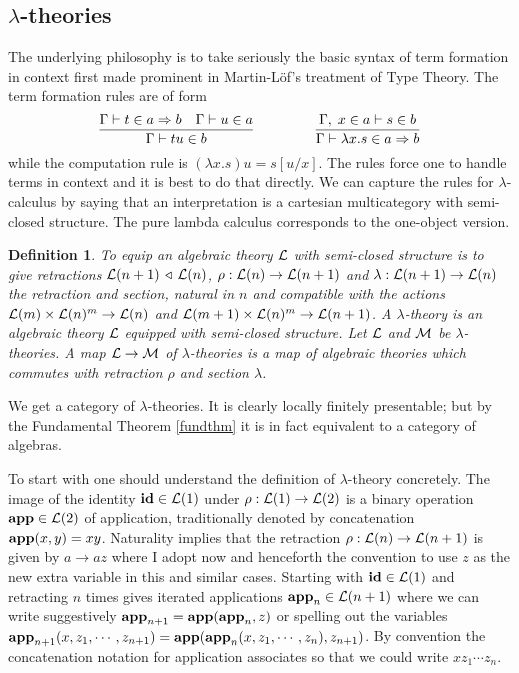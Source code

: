 \documentclass[12pt, amstex, amssymb]{article}
\newtheorem{definition}[theorem]{Definition}
\newcommand{\ret}{\triangleleft}
\newcommand{\mcat}{\cal}
\begin{document}
\subsection{$\lambda$-theories}
The underlying philosophy is to take
seriously the basic syntax of term formation 
in context first made prominent in
Martin-L\"{o}f's treatment of Type Theory.
The term formation rules are of form
\[
 \dfrac{\Gamma \vdash t \in a \Rightarrow b
 \quad \Gamma \vdash u \in a}{\Gamma \vdash tu \in b}
 \hspace{1.5cm} 
\dfrac{\Gamma, \;  x \in a \vdash s \in b}
{\Gamma \vdash \lambda x.s \in a \Rightarrow b}
\]
while the computation rule is
$(\lambda x. s)u = s[u/x]$. The rules force one to 
handle terms in context and it is best to do that
directly. We can  capture the rules for $\lambda$-calculus
by saying that an interpretation
is a cartesian multicategory
with semi-closed structure. The pure lambda calculus 
corresponds to the one-object version.
\begin{definition}\label{lambda}
To equip an algebraic theory $\mcat L$ with {\em semi-closed structure}
is to give retractions ${\mcat L}(n+1) \, \ret \, {\mcat L}(n)$,
$\rho :{\mcat L}(n) \to {\mcat L}(n+1)$
and $\lambda: {\mcat L}(n+1) \to {\mcat L}(n)$ the {\em retraction}
and {\em section},
natural in $n$ and compatible with the actions
${\mcat L}(m) \times {\mcat L}(n)^m \to {\mcat L}(n)$ and
${\mcat L}(m+1) \times {\mcat L}(n)^m \to {\mcat L}(n+1)$.
A {\em $\lambda$-theory} is an
algebraic theory $\mcat L$ equipped with semi-closed
structure.
Let $\mcat L$ and $\mcat M$ be $\lambda$-theories. A {\em map
${\mcat L} \to {\mcat M}$ of $\lambda$-theories}
is a map of algebraic theories which commutes with retraction $\rho$
and section $\lambda$.
\end{definition}
We get a category of $\lambda$-theories. It is clearly
locally finitely presentable; but by the Fundamental Theorem \ref{fundthm}
it is in fact
equivalent to a category of algebras.

To start with one should understand the definition of $\lambda$-theory
concretely. The image of the identity ${\bf id} \in {\mcat L}(1)$ under 
$\rho: {\mcat L}(1) 
\to {\mcat L}(2)$ is a binary operation
${\bf app} \in {\mcat L}(2)$ of application, 
traditionally denoted by concatenation
${\bf app}(x,y) = xy$. 
Naturality implies that 
the retraction $\rho: {\mcat L}(n) \to {\mcat L}(n+1)$
is given by $a \to az$
where I adopt now and henceforth the convention to use $z$ as
the new extra variable in this and similar cases.
Starting with ${\bf id} \in {\mcat L}(1)$ and retracting $n$ times gives 
iterated applications ${\bf app}_n \in {\mcat L}(n+1)$ where we can write
suggestively ${\bf app}_{n+1} = {\bf app}({\bf app}_n,z)$ or spelling
out the variables 
${\bf app}_{n+1}(x, z_1, \cdots , z_{n+1}) = 
{\bf app}({\bf app}_n(x, z_1, \cdots , z_n), z_{n+1})$. By convention
the concatenation notation for application associates 
so that we could write $xz_1 \cdots z_n$.
\end{document}

